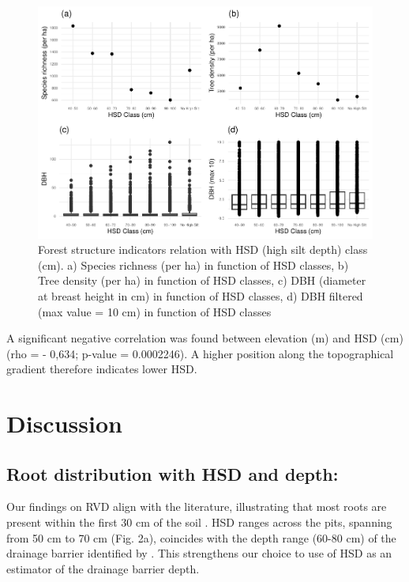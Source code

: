 \documentclass[fleqn,12pt]{latex/stylish_article} %
\begin{document}
\begin{figure}

{\centering \includegraphics[width=0.8\linewidth,]{pedoP16-report_files/figure-latex/auger-1} 

}

\caption{Forest structure indicators relation with HSD (high silt depth) class (cm). a) Species richness (per ha) in function of HSD classes, b) Tree density (per ha) in function of HSD classes, c) DBH (diameter at breast height in cm) in function of HSD classes, d) DBH filtered (max value = 10 cm) in function of HSD classes}\label{fig:auger}
\end{figure}

\normalsize

A significant negative correlation was found between elevation (m) and HSD (cm) (rho = - 0,634; p-value = 0.0002246). A higher position along the topographical gradient therefore indicates lower HSD.

\hypertarget{discussion}{%
\section{Discussion}\label{discussion}}

\hypertarget{root-distribution-with-hsd-and-depth}{%
\subsection{Root distribution with HSD and depth:}\label{root-distribution-with-hsd-and-depth}}

Our findings on RVD align with the literature, illustrating that most roots are present within the first 30 cm of the soil \citep{freschetStartingGuideRoot2021, schenkGlobalBiogeographyRoots2002}. HSD ranges across the pits, spanning from 50 cm to 70 cm (Fig. 2a), coincides with the depth range (60-80 cm) of the drainage barrier identified by \citet{epronSpatialVariationSoil2006}. This strengthens our choice to use of HSD as an estimator of the drainage barrier depth.
\end{document}
